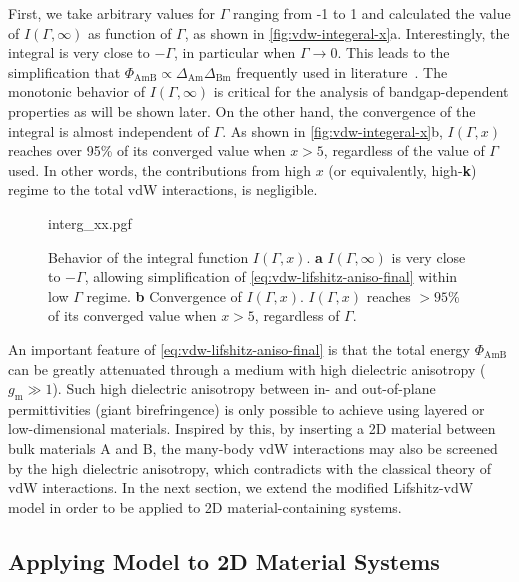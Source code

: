 %
First, we take arbitrary values for $\Gamma$ ranging from -1 to 1 and
calculated the value of $I(\Gamma, \infty)$ as function of $\Gamma$,
as shown in \autoref{fig:vdw-integeral-x}a. Interestingly, the
integral is very close to $-\Gamma$, in particular when
$\Gamma \to 0$. This leads to the simplification that
$\Phi_{\mathrm{AmB}} \propto \Delta_{\mathrm{Am}}
\Delta_{\mathrm{Bm}}$ frequently used in
literature~\cite{parsegian_van_2010_book,Rajter_2007_vdW,Dryden_2015_gecko}.
%
The monotonic behavior of $I(\Gamma, \infty)$ is
critical for the analysis of bandgap-dependent properties as will be
shown later.
%
On the other hand, the convergence of the integral is almost
independent of $\Gamma$. As shown in \autoref{fig:vdw-integeral-x}b,
$I(\Gamma, x)$ reaches over 95\% of its converged value when $x > 5$,
regardless of the value of $\Gamma$ used.
%
In other words, the contributions from high $x$ (or equivalently,
high-{\bfseries k}) regime to the total vdW interactions, is
negligible.

\begin{figure}[!htbp]
  \centering{}
  {interg_xx.pgf}
  \caption{\label{fig:vdw-integeral-x}%
    Behavior of the integral function $I(\Gamma, x)$. {\bfseries a}
    $I(\Gamma, \infty)$ is very close to $-\Gamma$, allowing
    simplification of \autoref{eq:vdw-lifshitz-aniso-final} within low
    $\Gamma$ regime. {\bfseries b} Convergence of $I(\Gamma,
    x)$. $I(\Gamma, x)$ reaches $>95$\% of its converged value when
    $x>5$, regardless of $\Gamma$.}
\end{figure}

An important feature of \autoref{eq:vdw-lifshitz-aniso-final} is that
the total energy $\Phi_{\mathrm{AmB}}$ can be greatly attenuated
through a medium with high dielectric anisotropy (\ie
$g_{\mathrm{m}} \gg 1$).
%
Such high dielectric anisotropy between in- and out-of-plane
permittivities (giant birefringence) is only possible to achieve using
layered \cite{Collin_1958_aniso,Weber_2000_aniso} or low-dimensional
\cite{Niu_2018_aniso,Segura_2018_aniso} materials. Inspired by this,
by inserting a 2D material between bulk materials A and B, the
many-body vdW interactions may also be
screened by the high dielectric anisotropy, which contradicts with the classical theory of vdW interactions.
%
In the next section, we extend the modified Lifshitz-vdW model in
order to be applied to 2D material-containing systems.


\subsection{Applying Model to 2D Material Systems}
\label{sec:vdw-model-2D}

